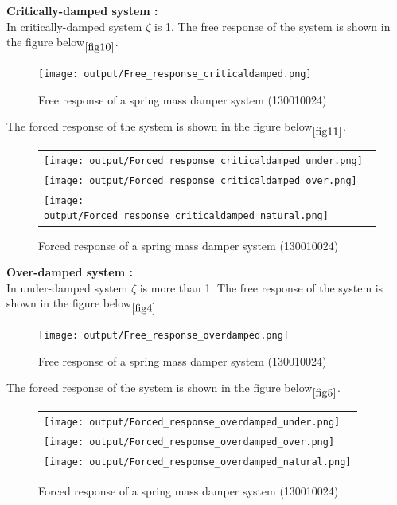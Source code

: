 \documentclass[11pt]{article}
\begin{document}
\newpage
\noindent\textbf{Critically-damped system :} \\
In critically-damped system $\zeta$ is 1.
The free response of the system is shown in the figure below$\phantom{}_{\ref{fig10}}$.

\begin{figure}[H]
	\centering
	\centering
	\texttt{[image: output/Free\_response\_criticaldamped.png]}
	\caption{Free response of a spring mass damper system (130010024)}
\end{figure}
\label{fig10}

\newpage
The forced response of the system is shown in the figure below$\phantom{}_{\ref{fig11}}$.

\begin{figure}[H]
	\centering
	\begin{tabular} {l}
	\texttt{[image: output/Forced\_response\_criticaldamped\_under.png]} \\
	\texttt{[image: output/Forced\_response\_criticaldamped\_over.png]} \\
	\texttt{[image: output/Forced\_response\_criticaldamped\_natural.png]} 
	\end{tabular}
	\caption{Forced response of a spring mass damper system (130010024)}
\end{figure}
\label{fig11}


 
\newpage
\noindent\textbf{Over-damped system :} \\
In under-damped system $\zeta$ is more than 1.
The free response of the system is shown in the figure below$\phantom{}_{\ref{fig4}}$.

\begin{figure}[H]
	\centering
	\centering
	\texttt{[image: output/Free\_response\_overdamped.png]}
	\caption{Free response of a spring mass damper system (130010024)}
\end{figure}
\label{fig4}

\newpage
The forced response of the system is shown in the figure below$\phantom{}_{\ref{fig5}}$.

\begin{figure}[H]
	\centering
	\begin{tabular} {l}
	\texttt{[image: output/Forced\_response\_overdamped\_under.png]} \\
	\texttt{[image: output/Forced\_response\_overdamped\_over.png]} \\
	\texttt{[image: output/Forced\_response\_overdamped\_natural.png]} 
	\end{tabular}
	\caption{Forced response of a spring mass damper system (130010024)}
\end{figure}
\label{fig5}
\end{document}
